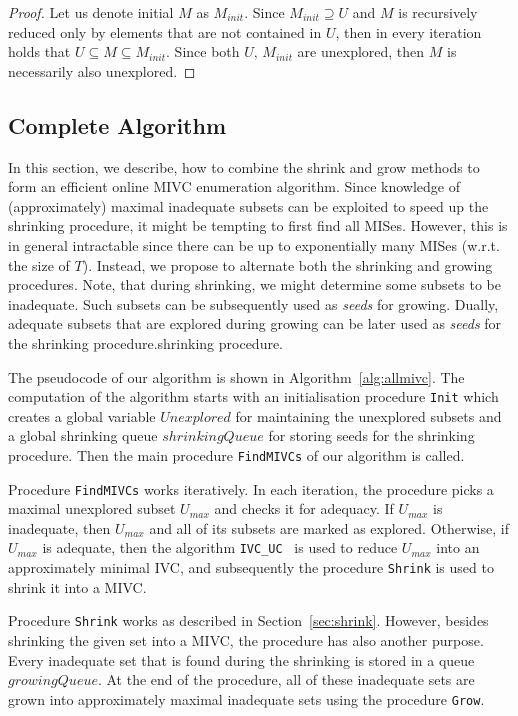\begin{proof}
Let us denote initial $M$ as $M_{init}$. Since $M_{init} \supseteq U$ and $M$ is recursively reduced only by elements that are not contained in $U$, then in every iteration holds that $U \subseteq M \subseteq M_{init}$. Since both $U, \, M_{init}$ are unexplored, then $M$ is necessarily also unexplored.
\end{proof}

\subsection{Complete Algorithm}
In this section, we describe, how to combine the shrink and grow methods to form an efficient online MIVC enumeration algorithm.
Since knowledge of (approximately) maximal inadequate subsets can be exploited to speed up the shrinking procedure, it might be tempting to first find all MISes. 
However, this is in general intractable since there can be up to exponentially many MISes (w.r.t. the size of $T$).
Instead, we propose to alternate both the shrinking and growing procedures. 
Note, that during shrinking, we might determine some subsets to be inadequate. Such subsets can be subsequently used as \emph{seeds} for growing. 
Dually, adequate subsets that are explored during growing can be later used as \emph{seeds} for the shrinking procedure.shrinking procedure.

The pseudocode of our algorithm is shown in Algorithm~\ref{alg:allmivc}. The computation of the algorithm starts with an initialisation procedure \texttt{Init} which creates a global variable $\mathit{Unexplored}$ for maintaining the unexplored subsets and a global shrinking queue $\mathit{shrinkingQueue}$ for storing seeds for the shrinking procedure. Then the main procedure \texttt{FindMIVCs} of our algorithm is called. 

Procedure \texttt{FindMIVCs} works iteratively. In each iteration, the procedure picks a maximal unexplored subset $U_{max}$ and checks it for adequacy. If $U_{max}$ is inadequate, then $U_{max}$ and all of its subsets are marked as explored. Otherwise, if $U_{max}$ is adequate, then the algorithm \texttt{IVC\_UC}~\cite{Ghass16} is used to reduce $U_{max}$ into an approximately minimal IVC, and subsequently the procedure \texttt{Shrink} is used to shrink it into a MIVC.

Procedure \texttt{Shrink} works as described in Section~\ref{sec:shrink}. However, besides shrinking the given set into a MIVC, the procedure has also another purpose. Every inadequate set that is found during the shrinking is stored in a queue $\mathit{growingQueue}$. At the end of the procedure, all of these inadequate sets are grown into approximately maximal inadequate sets using the procedure \texttt{Grow}.

